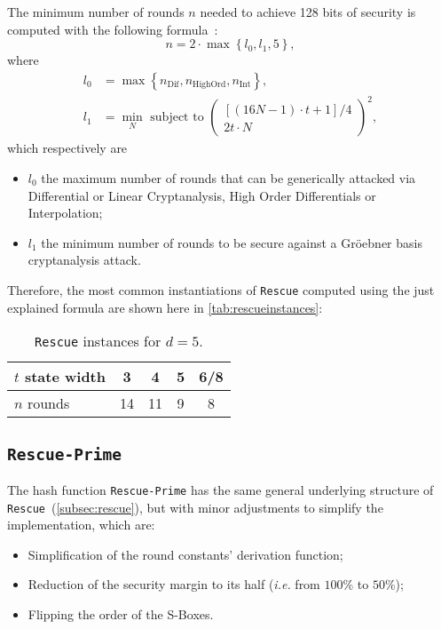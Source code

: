\documentclass[12pt, a4paper]{report}
\begin{document}
The minimum number of rounds $n$ needed to achieve 128 bits of security is computed with the following formula~\cite[Tab.~1]{rescue}:
\begin{equation}
  n = 2 \cdot \max \left\{l_0, l_1, 5 \right\},
  \label{eq:rescuerounds}
\end{equation}
where
\begin{align}
  l_0 & = \max \left\{ n_{\text{Dif}}, n_{\text{HighOrd}}, n_{\text{Int}} \right\} , \\
  l_1 & = \min_N \text{ subject to } \left( \begin{array}{c} [(16N - 1) \cdot t + 1]/4 \\ 2t \cdot N \end{array}\right)^2 ,
\end{align}
which respectively are 
\begin{itemize}
  \item $l_0$ the maximum number of rounds that can be generically attacked via Differential or Linear Cryptanalysis, High Order Differentials or Interpolation;
  \item $l_1$ the minimum number of rounds to be secure against a Gr\"oebner basis cryptanalysis attack.
\end{itemize}

Therefore, the most common instantiations of \texttt{Rescue} computed using the just explained formula are shown here in \autoref{tab:rescueinstances}:
\begin{table}[H]
  \caption{\texttt{Rescue} instances for $d = 5$.}\label{tab:rescueinstances}
  \begin{center}
    \begin{tabular}{|l|c|c|c|c|}
      \hline
      $t$ state width & 3 & 4 & 5 & 6/8 \\
      \hline
      $n$ rounds & 14 & 11 & 9 & 8 \\
      \hline
    \end{tabular}
  \end{center}
\end{table}

\subsection{\texttt{Rescue-Prime}}\label{subsec:rescueprime}

The hash function \texttt{Rescue-Prime} has the same general underlying structure of \texttt{Rescue}~(\autoref{subsec:rescue}), but with minor adjustments to simplify the implementation, which are:
\begin{itemize}
  \item Simplification of the round constants' derivation function;
  \item Reduction of the security margin to its half (\textsl{i.e.} from $100\%$ to $50\%$);
  \item Flipping the order of the S-Boxes.
\end{itemize}
\end{document}
